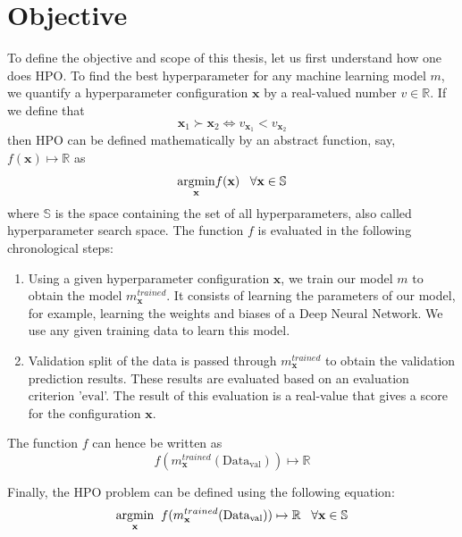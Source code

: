 \documentclass[12pt, twoside, ngerman]{report}
\begin{document}
\section{Objective}
\label{sec:HPODefinition}

To define the objective and scope of this thesis, let us first understand how one does HPO.
To find the best hyperparameter for any machine learning model $m$, we quantify a hyperparameter configuration $\textbf{x}$ by a real-valued number $v \in \mathbb{R}$. If we define that
$$
\textbf{x}_1 \succ  \textbf{x}_2 \iff v_{\textbf{x}_1} < v_{\textbf{x}_2}
$$
then HPO can be defined mathematically by an abstract function, say,  $f(\textbf{x}) \mapsto \mathbb{R}$ as
$$
     \underset{\rm \textbf{x}}{\rm argmin}  f(\textbf{x}) \;\;\;  \forall \textbf{x} \in \mathbb{S}
$$
where $\mathbb{S}$ is the space containing the set of all hyperparameters, also called hyperparameter search space.
The function $f$ is evaluated in the following chronological steps:
\begin{enumerate}
\item Using a given hyperparameter configuration $\textbf{x}$,  we train our model $m$ to obtain the model $m^{trained}_\textbf{x}$. It consists of learning the parameters of our model, for example, learning the weights and biases of a Deep Neural Network. We use any given training data to learn this model.
\item Validation split of the data is passed through $m^{trained}_\textbf{x}$ to obtain the validation prediction results. These results are evaluated based on an evaluation criterion '$\textrm{eval}$'. The result of this evaluation is a real-value that gives a score for the configuration $\textbf{x}$.
\end{enumerate}

The function $f$ can hence be written as 
$$
f(m^{trained}_\textbf{x} (\textrm{Data}_\textrm{val})) \mapsto \mathbb{R}
$$

Finally, the HPO problem can be defined using the following equation:
\begin{equation}
\label{eq:hpoobjectivefunc}
\underset{\rm \textbf{x}}{\rm argmin} \;\; f(m^{trained}_\textbf{x} (\textrm{Data}_\textrm{val})) \mapsto \mathbb{R}   \;\;\;  \forall \textbf{x} \in \mathbb{S}
\end{equation}

\label{sec:hpoConstraints}
\end{document}
